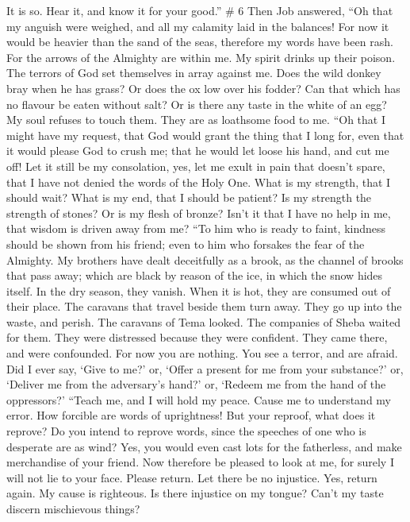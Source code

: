 It is so. Hear it, and know it for your good.'' \# 6  Then
Job answered,  ``Oh that my anguish were weighed, and all my
calamity laid in the balances!  For now it would be heavier
than the sand of the seas, therefore my words have been rash.
 For the arrows of the Almighty are within me. My spirit
drinks up their poison. The terrors of God set themselves in array
against me.  Does the wild donkey bray when he has grass? Or
does the ox low over his fodder?  Can that which has no
flavour be eaten without salt? Or is there any taste in the white of an
egg?  My soul refuses to touch them. They are as loathsome
food to me.  ``Oh that I might have my request, that God
would grant the thing that I long for,  even that it would
please God to crush me; that he would let loose his hand, and cut me
off!  Let it still be my consolation, yes, let me exult in
pain that doesn't spare, that I have not denied the words of the Holy
One.  What is my strength, that I should wait? What is my
end, that I should be patient?  Is my strength the strength
of stones? Or is my flesh of bronze?  Isn't it that I have
no help in me, that wisdom is driven away from me?  ``To
him who is ready to faint, kindness should be shown from his friend;
even to him who forsakes the fear of the Almighty.  My
brothers have dealt deceitfully as a brook, as the channel of brooks
that pass away;  which are black by reason of the ice, in
which the snow hides itself.  In the dry season, they
vanish. When it is hot, they are consumed out of their place.
 The caravans that travel beside them turn away. They go up
into the waste, and perish.  The caravans of Tema looked.
The companies of Sheba waited for them.  They were
distressed because they were confident. They came there, and were
confounded.  For now you are nothing. You see a terror, and
are afraid.  Did I ever say, `Give to me?' or, `Offer a
present for me from your substance?'  or, `Deliver me from
the adversary's hand?' or, `Redeem me from the hand of the oppressors?'
 ``Teach me, and I will hold my peace. Cause me to
understand my error.  How forcible are words of
uprightness! But your reproof, what does it reprove?  Do
you intend to reprove words, since the speeches of one who is desperate
are as wind?  Yes, you would even cast lots for the
fatherless, and make merchandise of your friend.  Now
therefore be pleased to look at me, for surely I will not lie to your
face.  Please return. Let there be no injustice. Yes,
return again. My cause is righteous.  Is there injustice on
my tongue? Can't my taste discern mischievous things?

